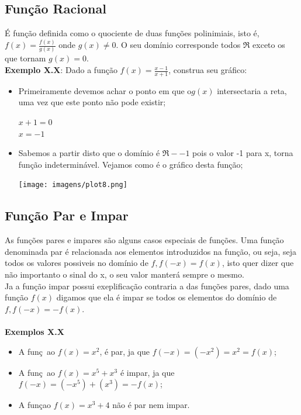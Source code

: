 \documentclass[a4paper,12pt,twoside,BCOR=10mm]{scrbook}
\begin{document}
\begin{titlepage}
\subsection{Função Racional}
É função definida como o quociente de duas funções polinimiais, isto é, $f(x) = \frac{f(x)}{g(x)}$ onde $g(x) \neq 0$. O seu domínio corresponde todos $\Re$ exceto os que tornam $g(x) = 0$.
\\
\textbf{Exemplo X.X}: Dado a função $f(x) = \frac{x - 1}{x + 1}$, construa seu gráfico: 
\begin{itemize}
\item Primeiramente devemos achar o ponto em que o$g(x)$ intersectaria a reta, uma vez que este ponto não pode existir;
\begin{center}
$x+1 = 0$\\
$x = -1$
\end{center}
\item Sabemos a partir disto que o domínio é $\Re - {-1}$ pois o valor -1 para x, torna função indeterminável. Vejamos como é o gráfico desta função;
\begin{center}
\texttt{[image: imagens/plot8.png]}
\end{center}
\end{itemize}

\subsection{Função Par e Impar}
As funções pares e impares são alguns casos especiais de funções. Uma função denominada par é relacionada aos elementos introduzidos na função, ou seja, seja todos os valores possiveis no domínio de $f, f(-x) = f(x)$, isto quer dizer que não importanto o sinal do x, o seu valor manterá sempre o mesmo.\\
Ja a função impar possui exeplificação contraria a das funções pares, dado uma função $f(x)$ digamos que ela é impar se todos os elementos do domínio de $f, f(-x) = -f(x)$.\\
\\
\textbf{Exemplos X.X} 
\begin{itemize}
\item A funç~ao $f(x) = x^{2}$, é par, ja que $f(-x) = (-x^{2}) = x^{2} = f(x)$;
\item A funç~ao $f(x) = x^{5} + x^{3}$ é impar, ja que $f(-x) = (-x^{5}) + (x^{3}) = -f(x)$;
\item A funçao $f(x) = x^{3} + 4$ não é par nem impar. 
\end{itemize}


\end{titlepage}
\end{document}
